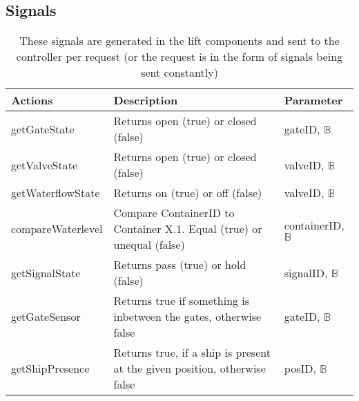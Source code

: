 		\subsection{Signals}
		\begin{table}[htbp]
			\centering
			\caption{These signals are generated in the lift components and sent to the controller per request (or the request is in the form of signals being sent constantly)}
			\begin{tabular}{lp{3in}l}
				\toprule
				\textbf{Actions} & \textbf{Description} & \textbf{Parameter} \\
				\hline
				getGateState & Returns open (true) or closed (false) & gateID, $ \mathbb{B} $ \\
				getValveState & Returns open (true) or closed (false) & valveID, $ \mathbb{B} $ \\
				getWaterflowState & Returns on (true) or off (false) & valveID, $ \mathbb{B} $ \\
				compareWaterlevel & Compare ContainerID to Container X.1. Equal (true) or unequal (false) & containerID, $ \mathbb{B} $ \\
				getSignalState & Returns pass (true) or hold (false) & signalID, $ \mathbb{B} $ \\
				getGateSensor &  Returns true if something is inbetween the gates, otherwise false & gateID, $ \mathbb{B} $ \\
				getShipPresence  & Returns true, if a ship is present at the given position, otherwise false & posID, $ \mathbb{B} $ \\
				\bottomrule
			\end{tabular}%
				\label{tab:addlabel}%
				\end{table}%
				
				
